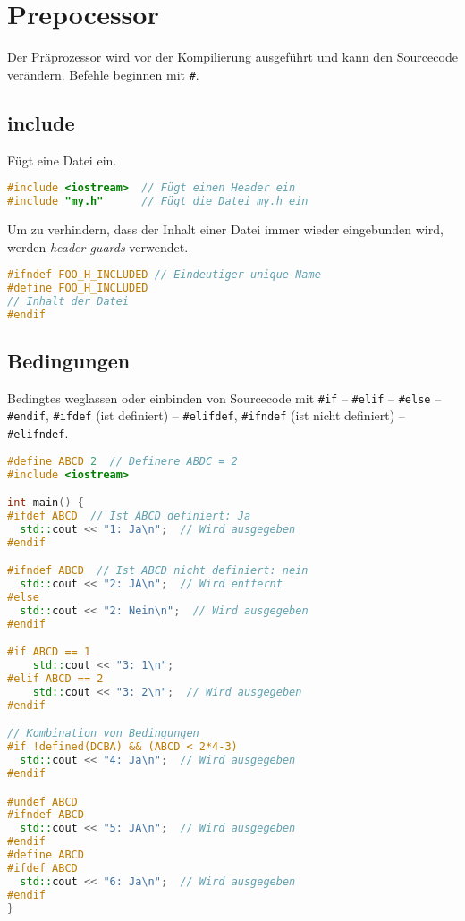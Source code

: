 \section{Prepocessor}

Der Präprozessor wird vor der Kompilierung ausgeführt und kann den Sourcecode
verändern. Befehle beginnen mit \lstinline|#|.

\subsection{include}

Fügt eine Datei ein.

\begin{lstlisting}[language=C++]
#include <iostream>  // Fügt einen Header ein
#include "my.h"      // Fügt die Datei my.h ein
\end{lstlisting}

Um zu verhindern, dass der Inhalt einer Datei immer wieder eingebunden wird,
werden \emph{header guards} verwendet.

\begin{lstlisting}[language=C++]
#ifndef FOO_H_INCLUDED // Eindeutiger unique Name
#define FOO_H_INCLUDED
// Inhalt der Datei
#endif
\end{lstlisting}

\subsection{Bedingungen}

Bedingtes weglassen oder einbinden von Sourcecode mit \lstinline|#if| --
\lstinline|#elif| -- \lstinline|#else| -- \lstinline|#endif|, \lstinline|#ifdef|
(ist definiert) -- \lstinline|#elifdef|, \lstinline|#ifndef| (ist nicht
definiert) -- \lstinline|#elifndef|.

\begin{lstlisting}[language=C++]
#define ABCD 2  // Definere ABDC = 2
#include <iostream>

int main() {
#ifdef ABCD  // Ist ABCD definiert: Ja
  std::cout << "1: Ja\n";  // Wird ausgegeben
#endif

#ifndef ABCD  // Ist ABCD nicht definiert: nein
  std::cout << "2: JA\n";  // Wird entfernt
#else
  std::cout << "2: Nein\n";  // Wird ausgegeben
#endif

#if ABCD == 1
    std::cout << "3: 1\n";
#elif ABCD == 2
    std::cout << "3: 2\n";  // Wird ausgegeben
#endif

// Kombination von Bedingungen
#if !defined(DCBA) && (ABCD < 2*4-3)
  std::cout << "4: Ja\n";  // Wird ausgegeben
#endif

#undef ABCD
#ifndef ABCD
  std::cout << "5: JA\n";  // Wird ausgegeben
#endif
#define ABCD
#ifdef ABCD
  std::cout << "6: Ja\n";  // Wird ausgegeben
#endif
}
\end{lstlisting}

